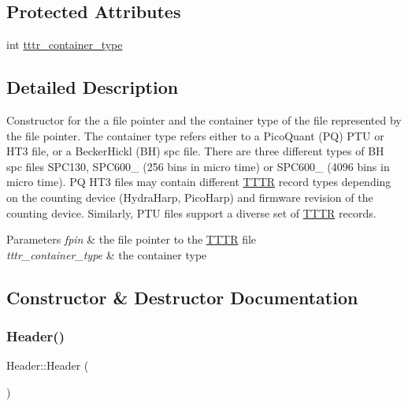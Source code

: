 \subsection*{Protected Attributes}
\begin{DoxyCompactItemize}
\item 
int \hyperlink{class_header_a67518ee8258bc7004cd4f375fbc10623}{tttr\+\_\+container\+\_\+type}
\end{DoxyCompactItemize}


\subsection{Detailed Description}
Constructor for the a file pointer and the container type of the file represented by the file pointer. The container type refers either to a Pico\+Quant (PQ) P\+TU or H\+T3 file, or a Becker\+Hickl (BH) spc file. There are three different types of BH spc files S\+P\+C130, S\+P\+C600\+\_ (256 bins in micro time) or S\+P\+C600\+\_ (4096 bins in micro time). PQ H\+T3 files may contain different \hyperlink{class_t_t_t_r}{T\+T\+TR} record types depending on the counting device (Hydra\+Harp, Pico\+Harp) and firmware revision of the counting device. Similarly, P\+TU files support a diverse set of \hyperlink{class_t_t_t_r}{T\+T\+TR} records.


\begin{DoxyParams}{Parameters}
{\em fpin} & the file pointer to the \hyperlink{class_t_t_t_r}{T\+T\+TR} file \\
\hline
{\em tttr\+\_\+container\+\_\+type} & the container type \\
\hline
\end{DoxyParams}


\subsection{Constructor \& Destructor Documentation}
\mbox{\label{class_header_ab20eba80063f6fa6a74c474f09bca886}} 
\subsubsection{\texorpdfstring{Header()}{Header()}\hspace{0.1cm}{\footnotesize\ttfamily [1/2]}}
{\footnotesize\ttfamily Header\+::\+Header (\begin{DoxyParamCaption}{ }\end{DoxyParamCaption})}

